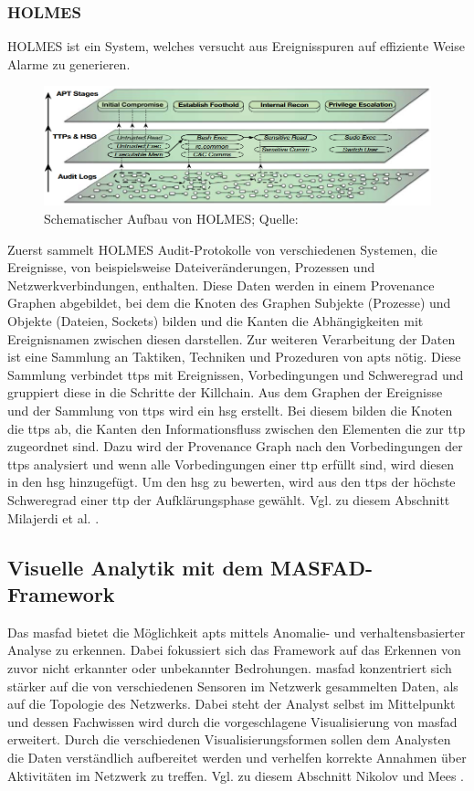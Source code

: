 \documentclass[conference]{IEEEtran}
\begin{document}
\subsubsection{HOLMES}
HOLMES ist ein System, welches versucht aus Ereignisspuren auf effiziente Weise Alarme zu generieren.
\begin{figure}[htbp]
    \centerline{\includegraphics[scale=0.5]{figures/HOLMES.png}}
    \caption{Schematischer Aufbau von HOLMES; Quelle: \cite{Milajerdi2019}}
    \label{fig.holmes}
\end{figure}
Zuerst sammelt HOLMES Audit-Protokolle von verschiedenen Systemen, die Ereignisse, von beispielsweise Dateiveränderungen, Prozessen und Netzwerkverbindungen, enthalten.
Diese Daten werden in einem Provenance Graphen abgebildet, bei dem die Knoten des Graphen Subjekte (Prozesse) und Objekte (Dateien, Sockets) bilden und die Kanten die Abhängigkeiten mit Ereignisnamen zwischen diesen darstellen.
Zur weiteren Verarbeitung der Daten ist eine Sammlung an Taktiken, Techniken und Prozeduren von \acp{apt} nötig.
Diese Sammlung verbindet \acp{ttp} mit Ereignissen, Vorbedingungen und Schweregrad und gruppiert diese in die Schritte der Killchain.
Aus dem Graphen der Ereignisse und der Sammlung von \acp{ttp} wird ein \ac{hsg} erstellt.
Bei diesem bilden die Knoten die \acp{ttp} ab, die Kanten den Informationsfluss zwischen den Elementen die zur \ac{ttp} zugeordnet sind.
Dazu wird der Provenance Graph nach den Vorbedingungen der \acp{ttp} analysiert und wenn alle Vorbedingungen einer \ac{ttp} erfüllt sind, wird diesen in den \ac{hsg} hinzugefügt.
Um den  \ac{hsg} zu bewerten, wird aus den \acp{ttp} der höchste Schweregrad einer \ac{ttp} der Aufklärungsphase gewählt.
Vgl. zu diesem Abschnitt Milajerdi et al. \cite{Milajerdi2019}.

\subsection{Visuelle Analytik mit dem MASFAD-Framework}
Das \ac{masfad} bietet die Möglichkeit \acp{apt} mittels Anomalie- und verhaltensbasierter Analyse zu erkennen.
Dabei fokussiert sich das Framework auf das Erkennen von zuvor nicht erkannter oder unbekannter Bedrohungen.
\ac{masfad} konzentriert sich stärker auf die von verschiedenen Sensoren im Netzwerk gesammelten Daten, als auf die Topologie des Netzwerks.
Dabei steht der Analyst selbst im Mittelpunkt und dessen Fachwissen wird durch die vorgeschlagene Visualisierung von \ac{masfad} erweitert.
Durch die verschiedenen Visualisierungsformen sollen dem Analysten die Daten verständlich aufbereitet werden und verhelfen korrekte Annahmen über Aktivitäten im Netzwerk zu treffen.
Vgl. zu diesem Abschnitt Nikolov und Mees \cite{Nikolov2023}.
\end{document}
